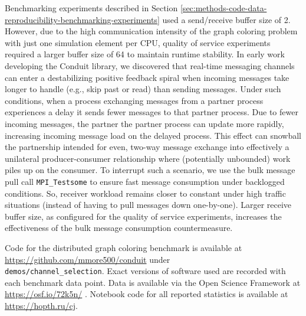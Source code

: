 Benchmarking experiments described in Section \ref{sec:methods-code-data-reproducibility-benchmarking-experiments} used a send/receive buffer size of 2.
However, due to the high communication intensity of the graph coloring problem with just one simulation element per CPU, quality of service experiments required a larger buffer size of 64 to maintain runtime stability.
In early work developing the Conduit library, we discovered that real-time messaging channels can enter a destabilizing positive feedback spiral when incoming messages take longer to handle (e.g., skip past or read) than sending messages.
Under such conditions, when a process exchanging messages from a partner process experiences a delay it sends fewer messages to that partner process.
Due to fewer incoming messages, the partner the partner process can update more rapidly, increasing incoming message load on the delayed process.
This effect can snowball the partnership intended for even, two-way message exchange into effectively a unilateral producer-consumer relationship where (potentially unbounded) work piles up on the consumer.
To interrupt such a scenario, we use the bulk message pull call \verb|MPI_Testsome| to ensure fast message consumption under backlogged conditions.
So, receiver workload remains closer to constant under high traffic situations (instead of having to pull messages down one-by-one).
Larger receive buffer size, as configured for the quality of service experiments, increases the effectiveness of the bulk message consumption countermeasure.

Code for the distributed graph coloring benchmark is available at \url{https://github.com/mmore500/conduit} under \\ \texttt{demos/channel\_selection}.
Exact versions of software used are recorded with each benchmark data point.
Data is available via the Open Science Framework at \url{https://osf.io/72k5n/} \citep{foster2017open}.
Notebook code for all reported statistics is available at \url{https://hopth.ru/cj}.
